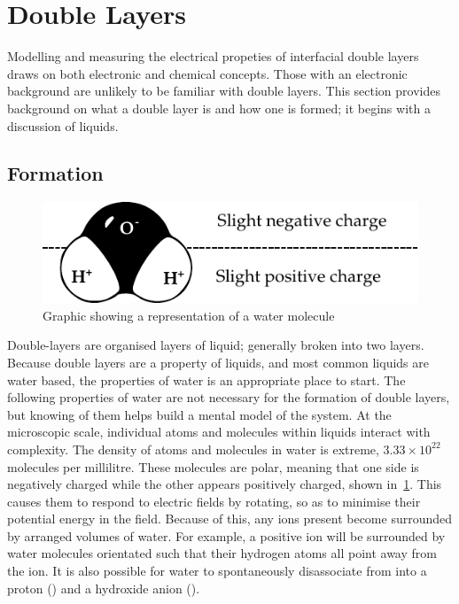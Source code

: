 

\section{Double Layers}
  \label{sect:background_doubleLayers}


  Modelling and measuring the electrical propeties of interfacial double layers draws on both electronic and chemical concepts.
  Those with an electronic background are unlikely to be familiar with double layers.
  This section provides background on what a double layer is and how one is formed; it begins with a discussion of liquids.


  \subsection{Formation}
    \label{sub:background_doubleLayers_formation}


    \begin{figure}
        \begin{center}
            \includegraphics{content/introduction/graphics/polarWater}
        \end{center}
        \caption{Graphic showing a representation of a water molecule}
        \label{fig:waterMolecule}
    \end{figure}
    Double-layers are organised layers of liquid; generally broken into two layers.
    Because double layers are a property of liquids, and most common liquids are water based, the properties of water is an appropriate place to start.
    The following properties of water are not necessary for the formation of double layers, but knowing of them helps build a mental model of the system.
    At the microscopic scale, individual atoms and molecules within liquids interact with complexity.
    The density of atoms and molecules in water is extreme, $3.33\times10^{22}$  molecules per millilitre.
    These molecules are polar, meaning that one side is negatively charged while the other appears positively charged, shown in~\cref{fig:waterMolecule}.
    This causes them to respond to electric fields by rotating, so as to minimise their potential energy in the field.
    Because of this, any ions present become surrounded by arranged volumes of water.
    For example, a positive ion will be surrounded by water molecules orientated such that their hydrogen atoms all point away from the ion.
    It is also possible for water to spontaneously disassociate from  into a proton () and a hydroxide anion  ().

